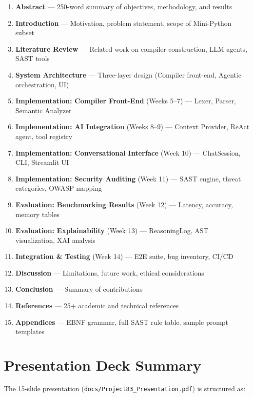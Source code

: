 \documentclass[a4paper,11pt]{article}
\begin{document}
\begin{enumerate}
    \item \textbf{Abstract} --- 250-word summary of objectives, methodology, and results
    \item \textbf{Introduction} --- Motivation, problem statement, scope of Mini-Python subset
    \item \textbf{Literature Review} --- Related work on compiler construction, LLM agents, SAST tools
    \item \textbf{System Architecture} --- Three-layer design (Compiler front-end, Agentic orchestration, UI)
    \item \textbf{Implementation: Compiler Front-End} (Weeks 5--7) --- Lexer, Parser, Semantic Analyzer
    \item \textbf{Implementation: AI Integration} (Weeks 8--9) --- Context Provider, ReAct agent, tool registry
    \item \textbf{Implementation: Conversational Interface} (Week 10) --- ChatSession, CLI, Streamlit UI
    \item \textbf{Implementation: Security Auditing} (Week 11) --- SAST engine, threat categories, OWASP mapping
    \item \textbf{Evaluation: Benchmarking Results} (Week 12) --- Latency, accuracy, memory tables
    \item \textbf{Evaluation: Explainability} (Week 13) --- ReasoningLog, AST visualization, XAI analysis
    \item \textbf{Integration \& Testing} (Week 14) --- E2E suite, bug inventory, CI/CD
    \item \textbf{Discussion} --- Limitations, future work, ethical considerations
    \item \textbf{Conclusion} --- Summary of contributions
    \item \textbf{References} --- 25+ academic and technical references
    \item \textbf{Appendices} --- EBNF grammar, full SAST rule table, sample prompt templates
\end{enumerate}

\section{Presentation Deck Summary}

The 15-slide presentation (\texttt{docs/Project83\_Presentation.pdf}) is structured as:
\end{document}
